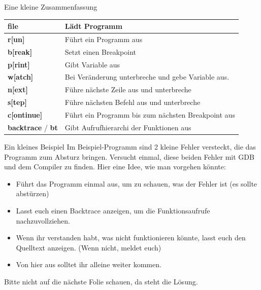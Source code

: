\begin{frame}{Eine kleine Zusammenfassung}
		\begin{tabular}{|l|l|}
			\hline
			\textbf{file} & L\"adt Programm\\\hline
			\textbf{r[un]} & F\"uhrt ein Programm aus\\\hline
			\textbf{b[reak]} & Setzt einen Breakpoint\\\hline
			\textbf{p[rint]} & Gibt Variable aus\\\hline
			\textbf{w[atch]} & Bei Ver\"anderung unterbreche und gebe Variable aus.\\\hline
			\textbf{n[ext]} & F\"uhre n\"achste Zeile aus und unterbreche\\\hline
			\textbf{s[tep]} & F\"uhre n\"achsten Befehl aus und unterbreche\\\hline
			\textbf{c[ontinue]} & F\"uhrt ein Programm bis zum n\"achsten Breakpoint aus\\\hline
			\textbf{backtrace} / \textbf{bt} & Gibt Aufrufhierarchi der Funktionen aus\\\hline
		\end{tabular}	
\end{frame}

\begin{frame}{Ein kleines Beispiel}
Im Beispiel-Programm sind 2 kleine Fehler versteckt, die das Programm zum Absturz bringen. Versucht einmal, diese beiden Fehler mit GDB und dem Compiler zu finden. Hier eine Idee, wie man vorgehen könnte:
\begin{itemize}
 \item F\"uhrt das Programm einmal aus, um zu schauen, was der Fehler ist (es sollte abstürzen)
 \item Lasst euch einen Backtrace anzeigen, um die Funktionsaufrufe nachzuvollziehen.
 \item Wenn ihr verstanden habt, was nicht funktionieren könnte, lasst euch den Quelltext anzeigen. (Wenn nicht, meldet euch)
 \item Von hier aus solltet ihr alleine weiter kommen.
\end{itemize}
 Bitte nicht auf die n\"achste Folie schauen, da steht die Lösung. 
\end{frame}

